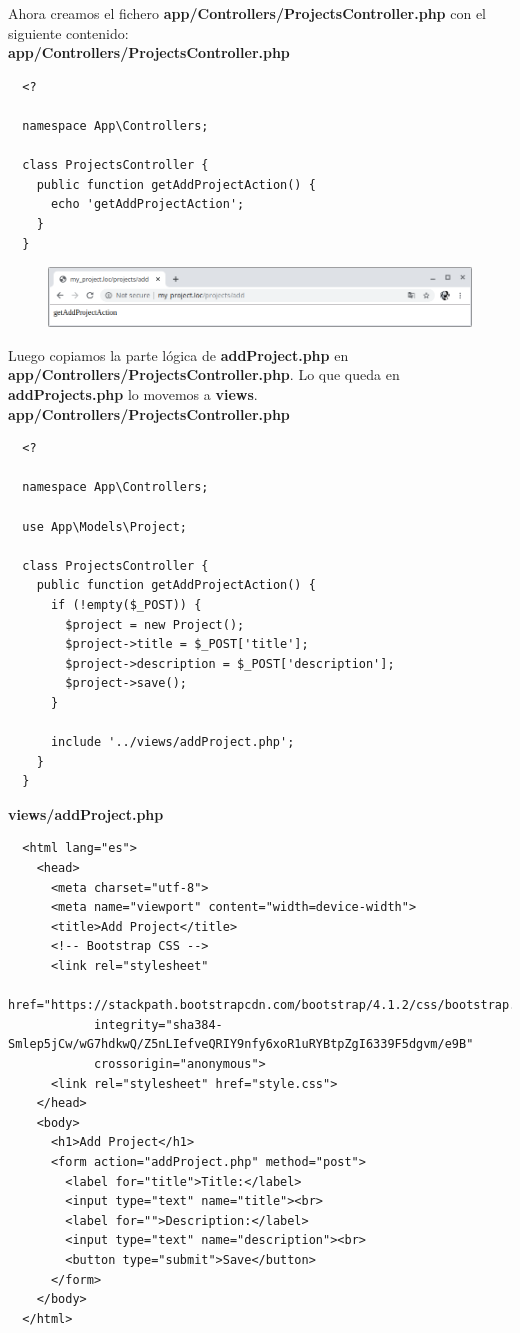 \documentclass{article}
\begin{document}
Ahora creamos el fichero \textbf{app/Controllers/ProjectsController.php} con el
siguiente contenido:\\

\textbf{app/Controllers/ProjectsController.php}
\begin{verbatim}
  <?

  namespace App\Controllers;

  class ProjectsController {
    public function getAddProjectAction() {
      echo 'getAddProjectAction';
    }
  }
\end{verbatim}

\begin{figure}[h!]
  \centering
  \includegraphics[scale=0.5]{./Pictures/133_getAddProject_OK.png}
\end{figure}

Luego copiamos la parte lógica de \textbf{addProject.php} en
\textbf{app/Controllers/ProjectsController.php}. Lo que queda en
\textbf{addProjects.php} lo movemos a \textbf{views}.\\

\textbf{app/Controllers/ProjectsController.php}
\begin{verbatim}
  <?

  namespace App\Controllers;

  use App\Models\Project;

  class ProjectsController {
    public function getAddProjectAction() {
      if (!empty($_POST)) {
        $project = new Project();
        $project->title = $_POST['title'];
        $project->description = $_POST['description'];
        $project->save();
      }

      include '../views/addProject.php';
    }
  }
\end{verbatim}

\newpage

\textbf{views/addProject.php}
\begin{verbatim}
  <html lang="es">
    <head>
      <meta charset="utf-8">
      <meta name="viewport" content="width=device-width">
      <title>Add Project</title>
      <!-- Bootstrap CSS -->
      <link rel="stylesheet"
            href="https://stackpath.bootstrapcdn.com/bootstrap/4.1.2/css/bootstrap.min.css"
            integrity="sha384-Smlep5jCw/wG7hdkwQ/Z5nLIefveQRIY9nfy6xoR1uRYBtpZgI6339F5dgvm/e9B"
            crossorigin="anonymous">
      <link rel="stylesheet" href="style.css">
    </head>
    <body>
      <h1>Add Project</h1>
      <form action="addProject.php" method="post">
        <label for="title">Title:</label>
        <input type="text" name="title"><br>
        <label for="">Description:</label>
        <input type="text" name="description"><br>
        <button type="submit">Save</button>
      </form>
    </body>
  </html>
\end{verbatim}
\end{document}
